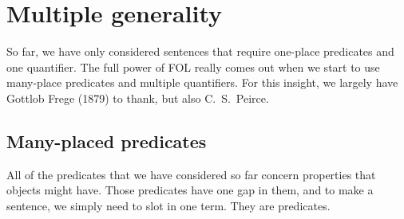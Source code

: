 

\chapter{Multiple generality}\label{s:MultipleGenerality}
So far, we have only considered sentences that require one-place predicates and one quantifier. The full power of FOL really comes out when we start to use many-place predicates and multiple quantifiers. For this insight, we largely have \foreignlanguage{german}{Gottlob Frege} (1879) to thank, but also C.~S.~Peirce.


\section{Many-placed predicates}
All of the predicates that we have considered so far concern properties that objects might have. Those predicates have one gap in them, and to make a sentence, we simply need to slot in one term. They are  predicates.

